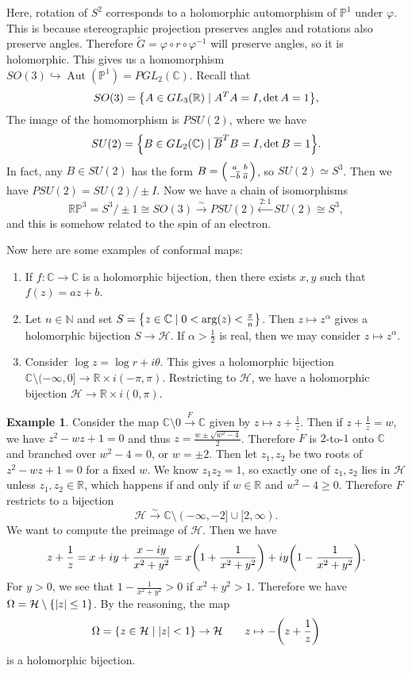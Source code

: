 \documentclass[leqno, openany]{memoir}
\theoremstyle{definition}
\newtheorem{exm}[thm]{Example}
\theoremstyle{remark}
\theoremstyle{plain}
\theoremstyle{definition}
\theoremstyle{remark}
\newcommand{\R}{\mathbb{R}}
\newcommand{\C}{\mathbb{C}}
\newcommand{\N}{\mathbb{N}}
\renewcommand{\P}{\mathbb{P}}
\newcommand{\mc}[1]{\mathcal{#1}}
\newcommand{\ol}[1]{\overline{#1}}
\newcommand{\wt}[1]{\widetilde{#1}}
\DeclareMathOperator{\Aut}{Aut}
\begin{document}
Here, rotation of $S^2$ corresponds to a holomorphic automorphism of $\P^1$
under $\varphi$. This is because stereographic projection preserves angles and
rotations also preserve angles. Therefore $\wt{G} = \varphi \circ r \circ
\varphi^{-1}$ will preserve angles, so it is holomorphic. This gives us a
homomorphism $SO(3) \hookrightarrow \Aut(\P^1) = PGL_2(\C)$. Recall that \[
SO(3) = \qty{A \in GL_3(\R) \mid A^T A = I, \det A = 1}, \] The image of the
homomorphism is $PSU(2)$, where we have \[ SU(2) = \qty{B \in GL_2(\C) \mid
    \ol{B}^T B = I, \det B = 1}. \] In fact, any $B \in SU(2)$ has the form $B
    = \begin{psmallmatrix} a & b \\ -\ol{b} & \ol{a} \end{psmallmatrix}$, so
    $SU(2) \simeq S^3$. Then we have $PSU(2) = SU(2) / \pm I$. Now we have a
    chain of isomorphisms \[ \R\P^3 = S^3 / \pm 1 \cong SO(3)
    \xrightarrow{\sim} PSU(2) \xleftarrow{2:1} SU(2) \cong S^3, \] and this is
    somehow related to the spin of an electron.

Now here are some examples of conformal maps: \begin{enumerate} \item If $f
    \colon \C \to \C$ is a holomorphic bijection, then there exists $x,y$ such
    that $f(z) = az + b$.  \item Let $n \in \N$ and set $S = \qty{z \in \C \mid
    0 < \arg(z) < \frac{\pi}{n}}$. Then $z \mapsto z^{\alpha}$ gives a
    holomorphic bijection $S \to \mc{H}$. If $\alpha > \frac{1}{2}$ is real,
    then we may consider $z \mapsto z^{\alpha}$.  \item Consider $\log z = \log
    r + i \theta$. This gives a holomorphic bijection $\C \setminus (-\infty,
    0] \to \R \times i (-\pi, \pi)$. Restricting to $\mc{H}$, we have a
    holomorphic bijection $\mc{H} \to \R \times i (0, \pi)$.  \end{enumerate}

\begin{exm} Consider the map $\C \setminus \qty{0} \xrightarrow{F} \C$ given by
    $z \mapsto z + \frac{1}{z}$. Then if $z + \frac{1}{z} = w$, we have $z^2 -
    wz + 1 = 0$ and thus $z = \frac{w \pm \sqrt{w^2-4}}{2}$. Therefore $F$ is
    $2$-to-$1$ onto $\C$ and branched over $w^2 - 4 = 0$, or $w = \pm 2$. Then
    let $z_1, z_2$ be two roots of $z^2 - wz + 1 = 0$ for a fixed $w$. We know
    $z_1 z_2 = 1$, so exactly one of $z_1, z_2$ lies in $\mc{H}$ unless $z_1,
    z_2 \in \R$, which happens if and only if $w \in \R$ and $w^2 - 4 \geq 0$.
    Therefore $F$ restricts to a bijection \[ \mc{H} \xrightarrow{\sim} \C
        \setminus (-\infty, -2] \cup [2, \infty). \] We want to compute the
        preimage of $\mc{H}$. Then we have \[ z + \frac{1}{z} = x + iy +
        \frac{x-iy}{x^2 + y^2} = x \qty(1 + \frac{1}{x^2 + y^2}) + iy \qty(1 -
    \frac{1}{x^2 + y^2}). \] For $y > 0$, we see that $1 - \frac{1}{x^2 + y^2}
    > 0$ if $x^2 + y^2 > 1$. Therefore we have $\Omega = \mc{H} \setminus
    \qty{\abs{z} \leq 1}$. By the reasoning, the map \[ \Omega = \qty{z \in
    \mc{H} \mid \abs{z} < 1} \to \mc{H} \qquad z \mapsto -\qty(z + \frac{1}{z})
\] is a holomorphic bijection.  \end{exm}
\end{document}
